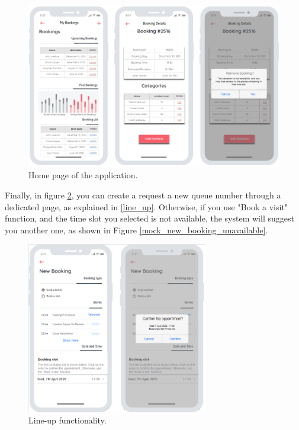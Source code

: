 \documentclass[table, 12pt]{article}
\begin{document}
\begin{figure}[H]
    \begin{center}
        \includegraphics[width=\textwidth]{assets/Mockups/mock_bookings.png}
        \caption{Home page of the application.}
        \label{mock_bookings}
    \end{center}
\end{figure}

Finally, in figure \ref{mock_new_booking}, you can create a request a new queue number through a dedicated page, as explained in \ref{line_up}.
Otherwise, if you use "Book a visit" function, and the time slot you selected is not available, the system will suggest you another one, as shown in Figure \ref{mock_new_booking_unavailable}.

\begin{figure}[H]
    \begin{center}
        \includegraphics[width=225pt]{assets/Mockups/mock_line_up.png}
        \caption{Line-up functionality.}
        \label{mock_new_booking}
    \end{center}
\end{figure}
\end{document}

